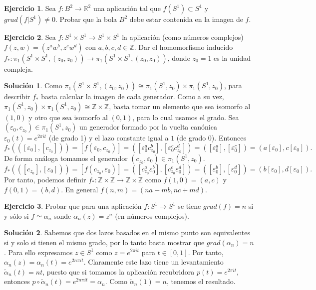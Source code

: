 \documentclass{article}
\theoremstyle{plain}
\theoremstyle{definition}
\newtheorem{exercise}{Ejercicio}
\newtheorem*{sol*}{Solución}
\newcommand{\Z}{\mathbb{Z}}
\begin{document}
\newpage

\begin{exercise}
Sea $f:B^2 \to \mathbb{R}^2$ una aplicaci\'on tal que $f(S^1) \subset S^1$ y
$grad (f|S^1)\neq 0$. Probar que la bola $B^2$ debe estar contenida en la imagen de $f$.
\end{exercise}

\newpage

\begin{exercise}
\item \label{pl11.n1}
Sea $f:S^1\times S^1 \to S^1 \times S^1$ la aplicaci\'on (como n\'umeros complejos) $f(z,w)=(z^a
w^b,z^c w^d)$ con $a,b,c,d \in \mathbb{Z}$. Dar el homomorfismo inducido
$f_*: \pi_1(S^1\times S^1,(z_0,z_0)) \to \pi_1(S^1\times S^1,(z_0,z_0))$, donde $z_0 = 1$ es la unidad compleja.
\end{exercise}
\begin{sol*}
Como $\pi_1(S^1\times S^1,(z_0,z_0))\cong\pi_1(S^1,z_0)\times\pi_1(S^1,z_0)$, para describir $f_*$ basta calcular la imagen de cada generador. Como a su vez, $\pi_1(S^1,z_0)\times\pi_1(S^1,z_0)\cong\Z\times\Z$, basta tomar un elemento que sea isomorfo al $(1,0)$ y otro que sea isomorfo al $(0,1)$, para lo cual usamos el grado. Sea $(\varepsilon_0,c_{z_0})\in\pi_1(S^1,z_0)$ un generador formado por la vuelta canónica $\varepsilon_0(t)=e^{2\pi it}$ (de grado 1) y el lazo constante igual a $1$ (de grado 0). Entonces
\[
f_*(([\varepsilon_0],[c_{z_0}]))=[f(\varepsilon_0,c_{z_0})]=([\varepsilon_0^a c_{z_0}^b],[\varepsilon_0^c c_{z_0}^d])=([\varepsilon_0^a],[\varepsilon_0^c])=(a[\varepsilon_0],c[\varepsilon_0]).
\]
De forma análoga tomamos el generador $(c_{z_0},\varepsilon_0)\in\pi_1(S^1,z_0)$.
\[
f_*(([c_{z_0}],[\varepsilon_0]))=[f(c_{z_0},\varepsilon_0)]=([c_{z_0}^a \varepsilon_0^b],[c_{z_0}^c\varepsilon_0^d])=([\varepsilon_0^b],[\varepsilon_0^d])=(b[\varepsilon_0],d[\varepsilon_0]).
\]
Por tanto, podemos definir $f_*:\Z\times\Z\to\Z\times\Z$ como $f(1,0)=(a,c)$ y $f(0,1)=(b,d)$. En general $f(n,m)=(na+mb,nc+md)$.
\end{sol*}

\newpage

\begin{exercise}
Probar que para una aplicaci\'on $f: S^1\to S^1$ se tiene $grad(f) = n$ si y s\'olo si $f\simeq \alpha_n$ sonde
$\alpha_n(z) = z^n$ (en n\'umeros complejos).
\end{exercise}
\begin{sol*}
Sabemos que dos lazos basados en el mismo punto son equivalentes si y solo si tienen el mismo grado, por lo tanto basta mostrar que $grad(\alpha_n)=n$. Para ello expresamos $z\in S^1$ como $z=e^{2\pi it}$ para $t\in[0,1]$. Por tanto, $\alpha_n(z)=\alpha_n(t)=e^{2n\pi i t}$. Claramente este lazo tiene un levantamiento $\tilde{\alpha}_n(t)=nt$, puesto que si tomamos la aplicación recubridora $p(t)=e^{2\pi it}$, entonces $p\circ\tilde{\alpha}_n(t)=e^{2n\pi it}=\alpha_n$. Como $\tilde{\alpha}_n(1)=n$, tenemos el resultado.
\end{sol*}
\newpage
\end{document}
